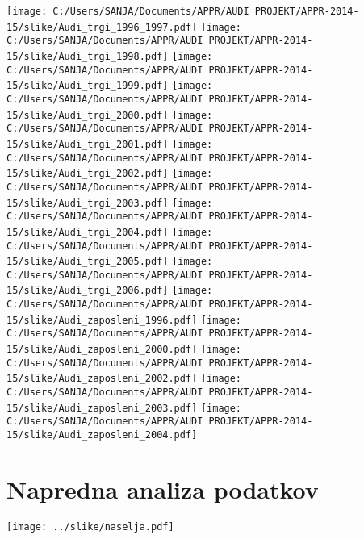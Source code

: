 \documentclass[11pt,a4paper]{article}
\begin{document}
\texttt{[image: C:/Users/SANJA/Documents/APPR/AUDI PROJEKT/APPR-2014-15/slike/Audi\_trgi\_1996\_1997.pdf]}
\texttt{[image: C:/Users/SANJA/Documents/APPR/AUDI PROJEKT/APPR-2014-15/slike/Audi\_trgi\_1998.pdf]}
\texttt{[image: C:/Users/SANJA/Documents/APPR/AUDI PROJEKT/APPR-2014-15/slike/Audi\_trgi\_1999.pdf]}
\texttt{[image: C:/Users/SANJA/Documents/APPR/AUDI PROJEKT/APPR-2014-15/slike/Audi\_trgi\_2000.pdf]}
\texttt{[image: C:/Users/SANJA/Documents/APPR/AUDI PROJEKT/APPR-2014-15/slike/Audi\_trgi\_2001.pdf]}
\texttt{[image: C:/Users/SANJA/Documents/APPR/AUDI PROJEKT/APPR-2014-15/slike/Audi\_trgi\_2002.pdf]}
\texttt{[image: C:/Users/SANJA/Documents/APPR/AUDI PROJEKT/APPR-2014-15/slike/Audi\_trgi\_2003.pdf]}
\texttt{[image: C:/Users/SANJA/Documents/APPR/AUDI PROJEKT/APPR-2014-15/slike/Audi\_trgi\_2004.pdf]}
\texttt{[image: C:/Users/SANJA/Documents/APPR/AUDI PROJEKT/APPR-2014-15/slike/Audi\_trgi\_2005.pdf]}
\texttt{[image: C:/Users/SANJA/Documents/APPR/AUDI PROJEKT/APPR-2014-15/slike/Audi\_trgi\_2006.pdf]}
\texttt{[image: C:/Users/SANJA/Documents/APPR/AUDI PROJEKT/APPR-2014-15/slike/Audi\_zaposleni\_1996.pdf]}
\texttt{[image: C:/Users/SANJA/Documents/APPR/AUDI PROJEKT/APPR-2014-15/slike/Audi\_zaposleni\_2000.pdf]}
\texttt{[image: C:/Users/SANJA/Documents/APPR/AUDI PROJEKT/APPR-2014-15/slike/Audi\_zaposleni\_2002.pdf]}
\texttt{[image: C:/Users/SANJA/Documents/APPR/AUDI PROJEKT/APPR-2014-15/slike/Audi\_zaposleni\_2003.pdf]}
\texttt{[image: C:/Users/SANJA/Documents/APPR/AUDI PROJEKT/APPR-2014-15/slike/Audi\_zaposleni\_2004.pdf]}


\section{Napredna analiza podatkov}

\texttt{[image: ../slike/naselja.pdf]}
\end{document}
